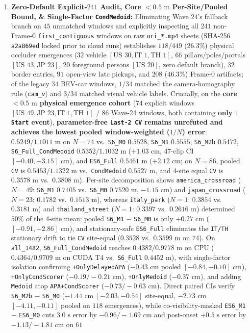 \documentclass[journal]{IEEEtran}
\begin{document}
\begin{enumerate}
  \item \textbf{Zero-Default Explicit-$241$ Audit, Core $<0.5\text{ m}$ Per-Site/Pooled Bound, \& Single-Factor \texttt{CondMedoid}:} Eliminating Wave 24's fallback branch on $45$ unmatched windows and explicitly inspecting all $241$ non-Frame-0 \texttt{first\_contiguous} windows on raw \texttt{ori\_*.mp4} sheets (SHA-256 \texttt{a2a869ed} locked prior to cloud runs) establishes $118 / 449$ ($26.3\%$) physical occluder emergences ($32$ vehicle $[\text{US }30, \text{IT }1, \text{TH }1]$, $66$ pillars/poles/portals $[\text{US }43, \text{JP }23]$, $20$ foreground persons $[\text{US }20]$, zero default branch), $32$ border entries, $91$ open-view late pickups, and $208$ ($46.3\%$) Frame-0 artifacts; of the legacy $34$ BEV-car windows, $1/34$ matched the camera-homography rule (\texttt{cam\_v}) and $3/34$ matched visual vehicle labels. Crucially, on the \textbf{core $<0.5\text{ m}$ physical emergence cohort} ($74$ explicit windows $[\text{US }49, \text{JP }23, \text{IT }1, \text{TH }1]$ / $86$ Wave-24 windows, both containing \textbf{only $1$ \texttt{Start} event}), \textbf{parameter-free \texttt{Last-2 CV} remains unrefuted and achieves the lowest pooled window-weighted ($1/N$) error}: $0.5249 / 1.1011\text{ m}$ on $N=74$ vs.\ \texttt{S6\_M0} $0.5528$, \texttt{S6\_M1} $0.5555$, \texttt{S6\_M2b} $0.5472$, \texttt{S6\_Full\_CondMedoid} $0.5352 / 1.1032\text{ m}$ ($+1.03\text{ cm}$, 47-clip CI $[-0.40, +3.15]\text{ cm}$), and \texttt{ES6\_Full} $0.5461\text{ m}$ ($+2.12\text{ cm}$; on $N=86$, pooled \texttt{CV} is $0.5453 / 1.1322\text{ m}$ vs.\ \texttt{CondMedoid} $0.5527\text{ m}$, and 4-site equal \texttt{CV} is $0.3578\text{ m}$ vs.\ $0.3808\text{ m}$). Per-site decomposition shows \texttt{america\_crossroad} ($N=49$: \texttt{S6\_M1} $0.7405$ vs.\ \texttt{S6\_M0} $0.7520\text{ m}$, $-1.15\text{ cm}$) and \texttt{japan\_crossroad} ($N=23$: $0.1782$ vs.\ $0.1513\text{ m}$), whereas \texttt{italy\_park} ($N=1$: $0.3854$ vs.\ $0.3181\text{ m}$) and \texttt{thailand\_street} ($N=1$: $0.3397$ vs.\ $0.2616\text{ m}$) determined $50\%$ of the 4-site mean; pooled \texttt{S6\_M1} $-$ \texttt{S6\_M0} is only $+0.27\text{ cm}$ ($[-0.91, +2.86]\text{ cm}$), and stationary-safe \texttt{ES6\_Full} eliminates the \texttt{IT/TH} stationary drift to tie \texttt{CV} site-equal ($0.3528$ vs.\ $0.3599\text{ m}$ on $74$). On \texttt{all\_1482}, \texttt{S6\_Full\_CondMedoid} reaches $0.4382 / 0.9778\text{ m}$ on CPU ($0.4364 / 0.9709\text{ m}$ on CUDA T4 vs.\ \texttt{S6\_Full} $0.4452\text{ m}$), with single-factor isolation confirming \texttt{+OnlyDelayedAPA} ($-0.43\text{ cm}$ pooled $[-0.84, -0.10]\text{ cm}$), \texttt{+OnlyCondScorer} ($-0.19 / -0.21\text{ cm}$), \texttt{+OnlyMedoid} ($-0.37\text{ cm}$), and adding \texttt{Medoid} atop \texttt{APA+CondScorer} ($-0.73 / -0.63\text{ cm}$). Direct paired CIs verify \texttt{S6\_M2b} $-$ \texttt{S6\_M0} ($-1.44\text{ cm}$ $[-2.03, -0.54]$ site-equal, $-2.73\text{ cm}$ $[-4.11, -0.11]$ pooled on $118$ emergences), while co-visibility-masked \texttt{ES6\_M1} $-$ \texttt{ES6\_M0} cuts $3.0\text{ s}$ error by $-0.96 / -1.69\text{ cm}$ and post-onset $+0.5\text{ s}$ error by $-1.13 / -1.81\text{ cm}$ on $61$ 
\end{enumerate}
\end{document}
